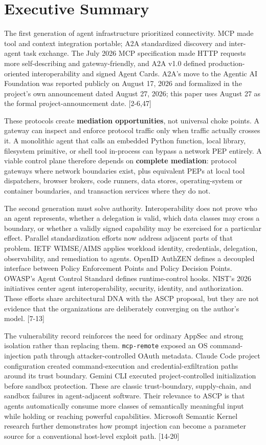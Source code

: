 \documentclass[
  10pt,
  letterpaper,
]{article}
\begin{document}
\section{Executive Summary}\label{executive-summary}

The first generation of agent infrastructure prioritized connectivity.
MCP made tool and context integration portable; A2A standardized
discovery and inter-agent task exchange. The July 2026 MCP specification
made HTTP requests more self-describing and gateway-friendly, and A2A
v1.0 defined production-oriented interoperability and signed Agent
Cards. A2A's move to the Agentic AI Foundation was reported publicly on
August 17, 2026 and formalized in the project's own announcement dated
August 27, 2026; this paper uses August 27 as the formal
project-announcement date. {[}2-6,47{]}

These protocols create \textbf{mediation opportunities}, not universal
choke points. A gateway can inspect and enforce protocol traffic only
when traffic actually crosses it. A monolithic agent that calls an
embedded Python function, local library, filesystem primitive, or shell
tool in-process can bypass a network PEP entirely. A viable control
plane therefore depends on \textbf{complete mediation}: protocol
gateways where network boundaries exist, plus equivalent PEPs at local
tool dispatchers, browser brokers, code runners, data stores,
operating-system or container boundaries, and transaction services where
they do not.

The second generation must solve authority. Interoperability does not
prove who an agent represents, whether a delegation is valid, which data
classes may cross a boundary, or whether a validly signed capability may
be exercised for a particular effect. Parallel standardization efforts
now address adjacent parts of that problem. IETF WIMSE/AIMS applies
workload identity, credentials, delegation, observability, and
remediation to agents. OpenID AuthZEN defines a decoupled interface
between Policy Enforcement Points and Policy Decision Points. OWASP's
Agent Control Standard defines runtime-control hooks. NIST's 2026
initiatives center agent interoperability, security, identity, and
authorization. These efforts share architectural DNA with the ASCP
proposal, but they are not evidence that the organizations are
deliberately converging on the author's model. {[}7-13{]}

The vulnerability record reinforces the need for ordinary AppSec and
strong isolation rather than replacing them. \texttt{mcp-remote} exposed
an OS command-injection path through attacker-controlled OAuth metadata.
Claude Code project configuration created command-execution and
credential-exfiltration paths around its trust boundary. Gemini CLI
executed project-controlled initialization before sandbox protection.
These are classic trust-boundary, supply-chain, and sandbox failures in
agent-adjacent software. Their relevance to ASCP is that agents
automatically consume more classes of semantically meaningful input
while holding or reaching powerful capabilities. Microsoft Semantic
Kernel research further demonstrates how prompt injection can become a
parameter source for a conventional host-level exploit path. {[}14-20{]}
\end{document}
